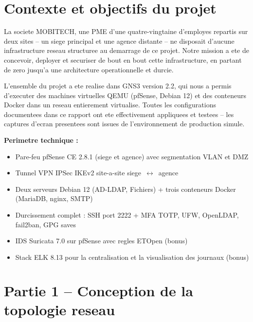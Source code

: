 \documentclass[11pt,a4paper]{article}
\begin{document}
\section{Contexte et objectifs du projet}

La societe MOBITECH, une PME d'une quatre-vingtaine d'employes repartis sur deux sites -- un siege principal et une agence distante -- ne disposait d'aucune infrastructure reseau structuree au demarrage de ce projet. Notre mission a ete de concevoir, deployer et securiser de bout en bout cette infrastructure, en partant de zero jusqu'a une architecture operationnelle et durcie.

L'ensemble du projet a ete realise dans GNS3 version 2.2, qui nous a permis d'executer des machines virtuelles QEMU (pfSense, Debian 12) et des conteneurs Docker dans un reseau entierement virtualise. Toutes les configurations documentees dans ce rapport ont ete effectivement appliquees et testees -- les captures d'ecran presentees sont issues de l'environnement de production simule.

\begin{tcolorbox}[colback=primarylight,colframe=primary!40,arc=4pt,boxrule=0.6pt,
  left=8pt,right=8pt,top=6pt,bottom=6pt,before skip=0.5em,after skip=0.5em]
\textbf{Perimetre technique :}
\begin{itemize}[nosep,leftmargin=1.2em]
  \item Pare-feu pfSense CE 2.8.1 (siege et agence) avec segmentation VLAN et DMZ
  \item Tunnel VPN IPSec IKEv2 site-a-site siege~$\leftrightarrow$~agence
  \item Deux serveurs Debian 12 (AD-LDAP, Fichiers) + trois conteneurs Docker (MariaDB, nginx, SMTP)
  \item Durcissement complet : SSH port 2222 + MFA TOTP, UFW, OpenLDAP, fail2ban, GPG saves
  \item IDS Suricata 7.0 sur pfSense avec regles ETOpen (bonus)
  \item Stack ELK 8.13 pour la centralisation et la visualisation des journaux (bonus)
\end{itemize}
\end{tcolorbox}

\section{Partie 1 -- Conception de la topologie reseau}
\end{document}
